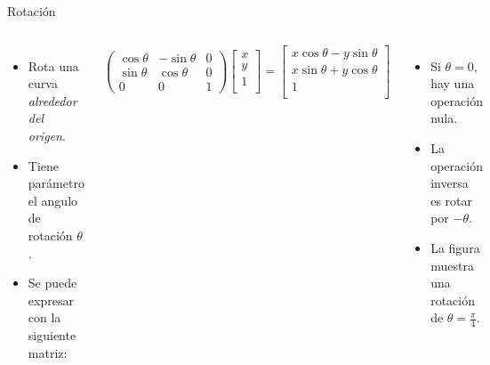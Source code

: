 \begin{frame}{Rotación}
\begin{columns}
\begin{itemize}
    \item Rota una curva \emph{alrededor del origen}.
    \item Tiene parámetro el angulo de rotación $\theta$.
    \item Se puede expresar con la siguiente matriz:
\end{itemize}
$$
\begin{pmatrix}
\cos \theta & -\sin \theta & 0 \\
\sin \theta & \cos \theta & 0 \\
0 & 0 & 1
\end{pmatrix}
\begin{bmatrix}
x \\
y \\
1 \\
\end{bmatrix}
=
\begin{bmatrix}
x \cos \theta - y \sin \theta \\
x \sin \theta + y \cos \theta  \\
1 \\
\end{bmatrix}
$$
\begin{itemize}
    \item Si $\theta = 0$, hay una operación nula.
    \item La operación inversa es rotar por $-\theta$.
    \item La figura muestra una rotación de $\theta = \frac{\pi}{4}$.
\end{itemize}
\begin{figure}[htp]
 \centering
 \begin{subfigure}[b]{0.4\textwidth}
   \includegraphics[width=\textwidth]{img/Square}

\end{subfigure}
\end{figure}
\end{columns}
\end{frame}

